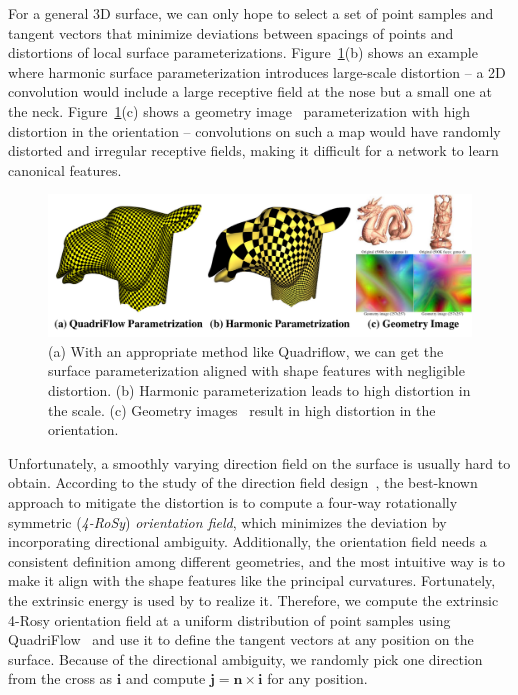 For a general 3D surface, we can only hope to select a set of point samples and tangent vectors that minimize deviations between spacings of points and distortions of local surface parameterizations. Figure~\ref{fig:texturenet-param}(b) shows an example where harmonic surface parameterization introduces large-scale distortion -- a 2D convolution would include a large receptive field at the nose but a small one at the neck. Figure~\ref{fig:texturenet-param}(c) shows a geometry image~\cite{gu2002geometry} parameterization with high distortion in the orientation -- convolutions on such a map would have randomly distorted and irregular receptive fields, making it difficult for a network to learn canonical features.
 \begin{figure}
    \centering
     \includegraphics[width=0.8\linewidth]{texturenet/param/param.pdf}
     \caption{(a) With an appropriate method like Quadriflow, we can get the surface parameterization aligned with shape features with negligible distortion. (b) Harmonic parameterization leads to high distortion in the scale. (c) Geometry images~\cite{gu2002geometry} result in high distortion in the orientation.}
     \label{fig:texturenet-param}
 \end{figure}
 
Unfortunately, a smoothly varying direction field on the surface is usually hard to obtain. According to the study of the direction field design~\cite{ray2008n,lai2010metric}, the best-known approach to mitigate the distortion is to compute a four-way rotationally symmetric (\emph{4-RoSy}) \emph{orientation field}, which minimizes the deviation by incorporating directional ambiguity. Additionally, the orientation field needs a consistent definition among different geometries, and the most intuitive way is to make it align with the shape features like the principal curvatures. Fortunately, the extrinsic energy is used by \cite{jakob2015instant,huang2018quadriflow} to realize it. Therefore, we compute the extrinsic 4-Rosy orientation field at a uniform distribution of point samples using QuadriFlow~\cite{huang2018quadriflow} and use it to define the tangent vectors at any position on the surface. Because of the directional ambiguity, we randomly pick one direction from the cross as $\mathbf{i}$ and compute $\mathbf{j}=\mathbf{n}\times \mathbf{i}$ for any position. 

